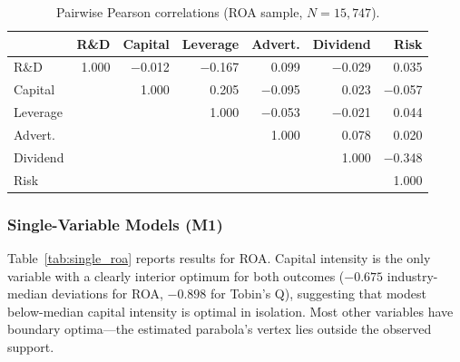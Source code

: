\documentclass[12pt]{article}
\begin{document}
\begin{table}[htbp]
\centering
\caption{Pairwise Pearson correlations (ROA sample, $N = 15{,}747$).}
\label{tab:correlations}
\begin{tabular}{lrrrrrr}
\toprule
 & R\&D & Capital & Leverage & Advert. & Dividend & Risk \\
\midrule
R\&D       &  1.000 & $-$0.012 & $-$0.167 &  0.099 & $-$0.029 &  0.035 \\
Capital    &        &    1.000 &    0.205 & $-$0.095 &  0.023 & $-$0.057 \\
Leverage   &        &          &    1.000 & $-$0.053 & $-$0.021 &  0.044 \\
Advert.    &        &          &          &    1.000 &    0.078 &  0.020 \\
Dividend   &        &          &          &          &    1.000 & $-$0.348 \\
Risk       &        &          &          &          &          &    1.000 \\
\bottomrule
\end{tabular}
\end{table}

\subsubsection{Single-Variable Models (M1)}

Table~\ref{tab:single_roa} reports results for ROA. Capital intensity is the only variable with a clearly interior optimum for both outcomes ($-0.675$ industry-median deviations for ROA, $-0.898$ for Tobin's Q), suggesting that modest below-median capital intensity is optimal in isolation. Most other variables have boundary optima---the estimated parabola's vertex lies outside the observed support.
\end{document}
